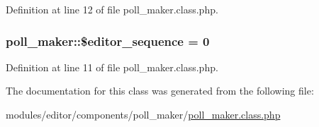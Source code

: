 Definition at line 12 of file poll\-\_\-maker.\-class.\-php.

\hypertarget{classpoll__maker_a17d99b5a9fe1df8e90cc572590e8a5e6}{
\subsubsection[{\$editor\-\_\-sequence}]{\setlength{\rightskip}{0pt plus 5cm}poll\-\_\-maker\-::\$editor\-\_\-sequence = 0}}\label{classpoll__maker_a17d99b5a9fe1df8e90cc572590e8a5e6}


Definition at line 11 of file poll\-\_\-maker.\-class.\-php.



The documentation for this class was generated from the following file\-:\begin{DoxyCompactItemize}
\item 
modules/editor/components/poll\-\_\-maker/\hyperlink{poll__maker_8class_8php}{poll\-\_\-maker.\-class.\-php}\end{DoxyCompactItemize}
